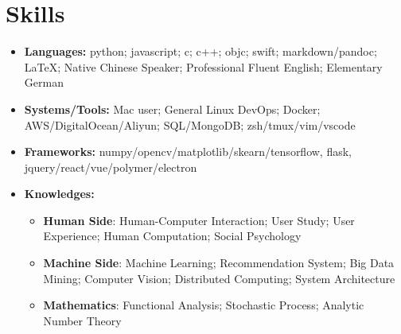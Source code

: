 \documentclass[letterpaper,11pt]{article}
\newcommand{\resumeItem}[2]{
  \item\small{
    \textbf{#1}{: #2 \vspace{-2pt}}
  }
}
\newcommand{\resumeSubHeadingListStart}{\begin{itemize}[leftmargin=*]}
\newcommand{\resumeSubHeadingListEnd}{\end{itemize}}
\newcommand{\resumeItemListStart}{\begin{itemize}}
\newcommand{\resumeItemListEnd}{\end{itemize}\vspace{-5pt}}
\begin{document}
\section{Skills}
 \resumeSubHeadingListStart
   \item{
     \textbf{Languages:}{ python; javascript; c; c++; objc; swift; markdown/pandoc; \LaTeX; Native Chinese Speaker; Professional Fluent English; Elementary German}
   }
   \item{
    \textbf{Systems/Tools:}{ Mac user; General Linux DevOps; Docker; AWS/DigitalOcean/Aliyun; SQL/MongoDB; zsh/tmux/vim/vscode}
   }
   \item{
    \textbf{Frameworks:}{ numpy/opencv/matplotlib/skearn/tensorflow, flask, jquery/react/vue/polymer/electron}
   }
   \item{
     \textbf{Knowledges:}{ 
       \resumeItemListStart
        \resumeItem{Human Side}
          { Human-Computer Interaction; User Study; User Experience; Human Computation; Social Psychology}
        \resumeItem{Machine Side}
          { Machine Learning; Recommendation System; Big Data Mining; Computer Vision; Distributed Computing; System Architecture}
        \resumeItem{Mathematics}
          { Functional Analysis; Stochastic Process; Analytic Number Theory}
      \resumeItemListEnd
     }
   }
 \resumeSubHeadingListEnd
\end{document}
